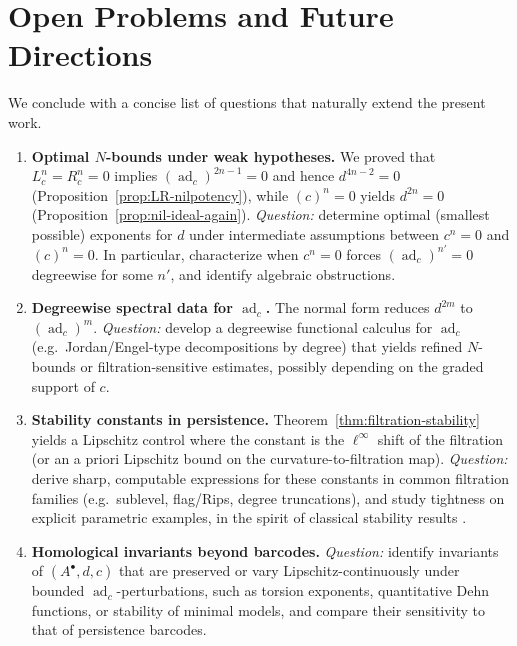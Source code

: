 \documentclass[preprint,12pt]{elsarticle}
\newcommand{\ad}{\operatorname{ad}}
\begin{document}
\section{Open Problems and Future Directions}\label{sec:open}

We conclude with a concise list of questions that naturally extend the present work.

\begin{enumerate}

\item \textbf{Optimal $N$-bounds under weak hypotheses.}
We proved that $L_c^n=R_c^n=0$ implies $(\ad_c)^{2n-1}=0$ and hence $d^{4n-2}=0$
(Proposition~\ref{prop:LR-nilpotency}), while $(c)^n=0$ yields $d^{2n}=0$
(Proposition~\ref{prop:nil-ideal-again}). 
\emph{Question:} determine optimal (smallest possible) exponents for $d$ under
intermediate assumptions between $c^n=0$ and $(c)^n=0$.
In particular, characterize when $c^n=0$ forces $(\ad_c)^{n'}=0$ degreewise for some $n'$,
and identify algebraic obstructions.

\item \textbf{Degreewise spectral data for $\ad_c$.}
The normal form reduces $d^{2m}$ to $(\ad_c)^m$.
\emph{Question:} develop a degreewise functional calculus for $\ad_c$ (e.g.\ Jordan/\!Engel-type
decompositions by degree) that yields refined $N$-bounds or filtration-sensitive estimates,
possibly depending on the graded support of $c$.

\item \textbf{Stability constants in persistence.}
Theorem~\ref{thm:filtration-stability} yields a Lipschitz control where the constant is the $\ell^\infty$ shift
of the filtration (or an a priori Lipschitz bound on the curvature-to-filtration map).
\emph{Question:} derive sharp, computable expressions for these constants in common filtration families
(e.g.\ sublevel, flag/Rips, degree truncations), and study tightness on explicit parametric examples,
in the spirit of classical stability results \cite{CohenSteinerEdelsbrunnerHarer2007,ChazalDeSilvaGlisseOudot2016}. %

\item \textbf{Homological invariants beyond barcodes.}
\emph{Question:} identify invariants of $(A^\bullet,d,c)$ that are preserved or vary
Lipschitz-continuously under bounded $\ad_c$-perturbations, such as torsion exponents,
quantitative Dehn functions, or stability of minimal models, and compare their sensitivity
to that of persistence barcodes.


\end{enumerate}
\end{document}
